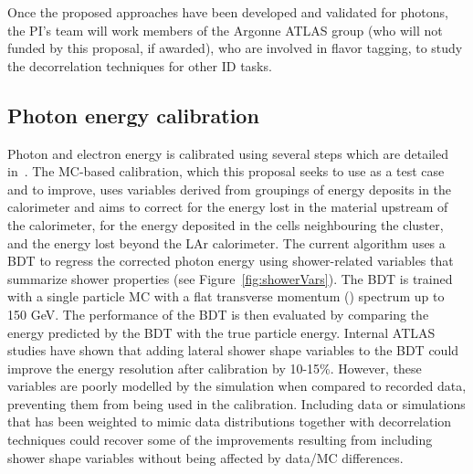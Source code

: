 \documentclass[letter, USenglish, 11pt, subfigure]{article}
\begin{document}
Once the proposed approaches have been developed and validated for photons, the PI's team will work members of the Argonne ATLAS group (who will not funded by this proposal, if awarded), who are involved in flavor tagging, to study the decorrelation techniques for other ID tasks.



\subsection{Photon energy calibration}


Photon and electron energy is calibrated using several steps which are detailed in~\cite{atlascollaboration2023electron}.
The MC-based calibration, which this proposal seeks to use as a test case and to improve, uses variables derived from groupings of energy deposits in the calorimeter and aims to correct for the energy lost in the material upstream of the calorimeter, for the energy deposited in the cells neighbouring the cluster, and the energy lost beyond the LAr calorimeter. The current algorithm uses a BDT to regress the corrected photon energy using shower-related variables that summarize shower properties (see Figure~\ref{fig:showerVars}). The BDT is trained with a single particle MC with a flat transverse momentum (\pt) spectrum up to 150 GeV. The performance of the BDT is then evaluated by comparing the energy predicted by the BDT with the true particle energy. Internal ATLAS studies have shown that adding lateral shower shape variables to the BDT could improve the energy resolution after calibration by 10-15\%. However, these variables are poorly modelled by the simulation when compared to recorded data, preventing them from being used in the calibration. Including data or simulations that has been weighted to mimic data distributions together with decorrelation techniques could recover some of the improvements resulting from including shower shape variables without being affected by data/MC differences.
\end{document}
